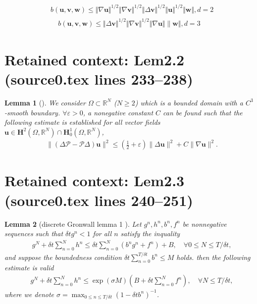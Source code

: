 \documentclass[10pt,a4paper]{amsart}
\theoremstyle{thmm}
\newtheorem{lemma}{Lemma}[section]
\begin{document}
	\begin{align}\label{2.3}
		& b(\bm{u,v,w})\leqslant \Vert\nabla\bm { u}\Vert^{1/2}\Vert \nabla\bm{v} \Vert^{1/2}\Vert\Delta\bm { v} \Vert_{}^{1/2}\Vert\bm {u} \Vert^{1/2}\Vert\bm {w} \Vert,  d=2
	\end{align}  
	\begin{align}\label{2.4}
		b(\bm{u,v,w})\leqslant \Vert\Delta\bm{ v} \Vert_{}^{1/2}\Vert\nabla\bm{v} \Vert^{1/2}\Vert\nabla\bm {u}\Vert\|\bm {w} \Vert,  d=3
	\end{align}


\section*{Retained context: Lem2.2 (source0.tex lines 233--238)}

	\begin{lemma}[\cite {J2007}]\label{Lem2.2}
		{\it We consider $\Omega \subset \mathbb{R}^N$ ($N \geq 2$) which is a bounded domain with a $C^3$-smooth boundary. $\forall \varepsilon > 0$,  a nonegative constant $C$ can be found such that the following estimate is established for all vector fields $\bm{u} \in \bm{H}^2(\Omega, \mathbb{R}^N) \cap \bm{H}_0^1(\Omega, \mathbb{R}^N)$,
			\begin{align}
				&\| (\Delta \mathcal{P}-\mathcal{P}\Delta) \bm{u}\|^2 \leq (\frac{1}{2}+\varepsilon) \|\Delta \bm{u}\|^2 +C\|\nabla \bm{u}\|^2.
		\end{align}  }
	\end{lemma}


\section*{Retained context: Lem2.3 (source0.tex lines 240--251)}

	\begin{lemma}[discrete Gronwall lemma 1 \cite{J2012}]\label{Lem2.3}
			{\it Let $g^n,h^n,b^n,f^n$ be nonnegative sequences  such that $\delta tg^n<1$ for all $n$  satisfy the inquality
			\begin{align}
				&g^N+\delta t\sum_{n=0}^N h^n\leq\delta t\sum_{n=0}^{N}(b^ng^n+f^n)+B,  
				\quad \forall0\leq N \leq T/\delta t,
			\end{align}
			and suppose the boundedness condition $ \delta t\sum_{n=0}^{T/\delta t}b^n \leq M$ holds. then the following estimate is valid
			\begin{align}
				&g^N+\delta t\sum_{n=0}^N h^n\leq \exp(\sigma M)(B+\delta t\sum_{n=0}^{N}f^n), \quad \forall N\leq T/\delta t,
			\end{align}  
			where we denote $\sigma=\max_{0\leqslant n\leqslant T/\delta t}(1-\delta t b^n)^{-1}$.}
	\end{lemma}
\end{document}
